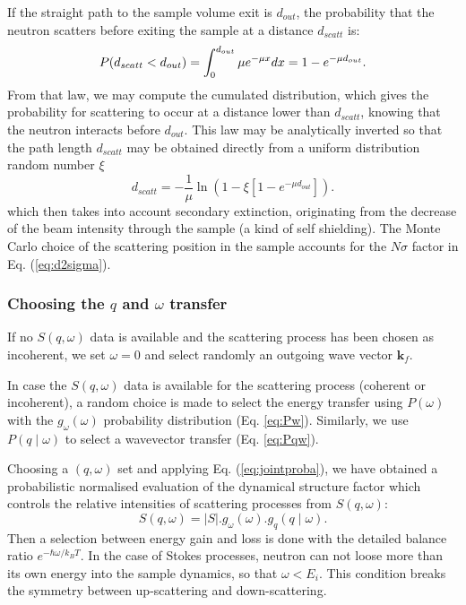 If the straight path to the sample volume exit is $d_{out}$, the probability that the neutron scatters before exiting the sample at a distance $d_{scatt}$ is:
\begin{equation}
P(d_{scatt} < d_{out}) = \int_0^{d_{out}} \mu e^{-\mu x}dx = 1 - e^{-\mu d_{out}}. \\
\end{equation}
From that law, we may compute the cumulated distribution, which gives the probability for scattering to occur at a distance lower than $d_{scatt}$, knowing that the neutron interacts before $d_{out}$. This law may be analytically inverted so that the path length $d_{scatt}$ may be obtained directly from a uniform distribution random number $\xi$
\begin{equation}
d_{scatt} = -\frac{1}{\mu} \ln(1 - \xi[1 -e^{-\mu d_{out}}]).
\end{equation}
which then takes into account secondary extinction, originating from the decrease of the beam intensity through the sample (a kind of self shielding).
The Monte Carlo choice of the scattering position in the sample accounts for the $N \sigma$ factor in Eq. (\ref{eq:d2sigma}).

\subsubsection{Choosing the $q$ and $\omega$ transfer}

If no $S(q, \omega)$ data is available and the scattering process has been chosen as incoherent, we set $\omega=0$ and select randomly an outgoing wave vector $\boldsymbol{k}_f$.

In case the $S(q, \omega)$ data is available for the scattering process (coherent or incoherent), a random choice is made to select the energy transfer using $P(\omega)$ with the $g_\omega(\omega)$ probability distribution (Eq. \ref{eq:Pw}).
Similarly, we use $P(q \mid \omega)$ to select a wavevector transfer (Eq. \ref{eq:Pqw}).

Choosing a $(q, \omega)$ set and applying Eq. (\ref{eq:jointproba}), we have obtained a probabilistic normalised evaluation of the dynamical structure factor which controls the relative intensities of scattering processes from $S(q, \omega)$:
\begin{equation}
S(q, \omega) = |S|.g_\omega(\omega).g_q(q \mid \omega) .
\end{equation}
Then a selection between energy gain and loss is done with the detailed balance ratio $e^{-\hbar \omega / k_B T}$. In the case of Stokes processes, neutron can not loose more than its own energy into the sample dynamics, so that $\omega < E_i$. This condition breaks the symmetry between up-scattering and down-scattering.

